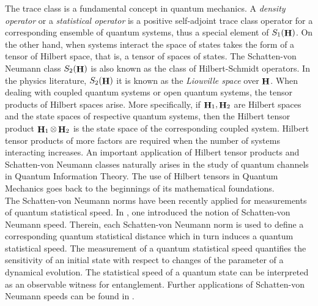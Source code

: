 \documentclass[a4paper,12pt,reqno]{amsart}
\theoremstyle{definition}
\theoremstyle{remark}
\numberwithin{equation}{section}
\DeclareMathOperator{\Hi}{{\bf H}}
\begin{document}
The trace class is a fundamental concept in quantum mechanics. A  {\em  density operator} or a {\em statistical operator} is a  positive self-adjoint trace class operator for a corresponding ensemble of quantum systems, thus a special element of $S_1(\Hi)$. On the other hand, when systems interact the space of states takes the form of a tensor of Hilbert space, that is, a tensor of spaces of states.  The Schatten-von Neumann class  $S_2(\Hi)$  is also known as the class of Hilbert-Schmidt operators. In the physics  literature, $S_2(\Hi)$ it is known as the {\em Liouville space} over $\Hi$. When dealing with coupled quantum systems or open quantum systems, the tensor products of Hilbert spaces arise. More specifically, if $\Hi_1, \Hi_2 $ are  Hilbert spaces and the state spaces of respective quantum systems, then the Hilbert tensor product  $\Hi_1\otimes\Hi_2$ is the state space of the corresponding coupled system. Hilbert tensor products of more factors are required  when the number of systems interacting increases.   An important application of Hilbert tensor products and Schatten-von Neumann classes naturally arises in the study of quantum channels in Quantum Information Theory. The use of Hilbert tensors in Quantum Mechanics goes back to the beginnings of its  mathematical foundations.  \\


The Schatten-von Neumann norms have been recently applied for measurements of quantum statistical speed. In \cite{mgas:sp}, one introduced the notion 
 of Schatten-von Neumann speed.  Therein, each Schatten-von Neumann norm is used to define a corresponding quantum  statistical distance which in turn induces a quantum statistical speed. The measurement of a quantum statistical speed quantifies the sensitivity of an initial state with respect to changes of the parameter of a dynamical evolution. The statistical speed of a quantum state can be interpreted as an observable witness for entanglement. Further applications of Schatten-von Neumann speeds can be found in \cite{schit:cc1}.\\

 
 
\end{document}
